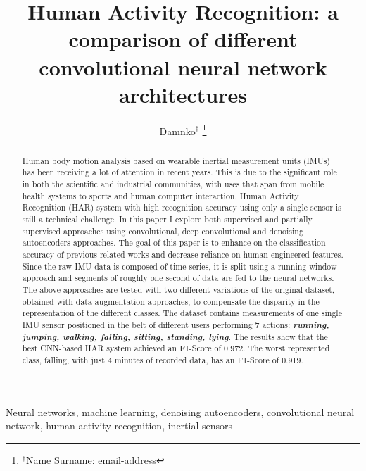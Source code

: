 \documentclass[10pt, conference, letterpaper]{IEEEtran}
\title{Human Activity Recognition: a comparison of different convolutional neural network architectures}
\author{Damnko$^\dag$
\thanks{$^\dag$Name Surname: email-address}
}
\begin{document}
\maketitle

\begin{abstract}
Human body motion analysis based on wearable inertial measurement units (IMUs) has been receiving a lot of attention in recent years. This is due to the significant role in both the scientific and industrial communities, with uses that span from mobile health systems to sports and human computer interaction. Human Activity Recognition (HAR) system with high recognition accuracy using only a single sensor is still a technical challenge. In this paper I explore both supervised and partially supervised approaches using convolutional, deep convolutional and denoising autoencoders approaches. The goal of this paper is to enhance on the classification accuracy of previous related works and decrease reliance on human engineered features. Since the raw IMU data is composed of time series, it is split using a running window approach and segments of roughly one second of data are fed to the neural networks. The above approaches are tested with two different variations of the original dataset, obtained with data augmentation approaches, to compensate the disparity in the representation of the different classes. The dataset contains measurements of one single IMU sensor positioned in the belt of different users performing 7 actions: \textit{\textbf{running, jumping, walking, falling, sitting, standing, lying}}. The results show that the best \mbox{CNN-based} HAR system achieved an \mbox{F1-Score} of 0.972. The worst represented class, falling, with just 4 minutes of recorded data, has an F1-Score of 0.919.
\end{abstract}

\IEEEkeywords
Neural networks, machine learning, denoising autoencoders, convolutional neural network, human activity recognition, inertial sensors
\endIEEEkeywords














\end{document}
